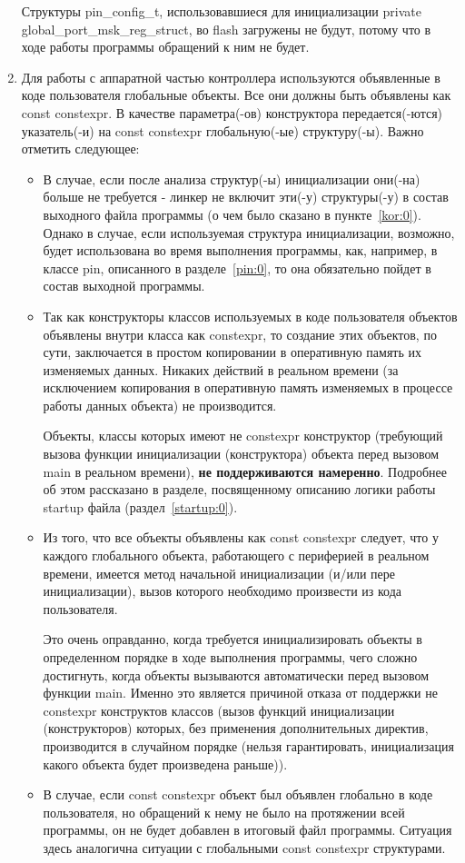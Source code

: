 \begin{enumerate}
	Структуры pin\_\-config\_\-t, использовавшиеся для инициализации private global\_\-port\_\-msk\_\-reg\_\-struct, во flash загружены не будут, потому что в ходе работы программы обращений к ним не будет.
	\label{kor:0}
	\item Для работы с аппаратной частью контроллера используются объявленные в коде пользователя глобальные объекты. Все они должны быть объявлены как const constexpr. В качестве параметра(-ов) конструктора передается(-ются) указатель(-и) на const constexpr глобальную(-ые) структуру(-ы). Важно отметить следующее:
	\begin{itemize}
		\item В случае, если после анализа структур(-ы) инициализации они(-на) больше не требуется - линкер не включит эти(-у) структуры(-у) в состав выходного файла программы (о чем было сказано в пункте~\ref{kor:0}). Однако в случае, если используемая структура инициализации, возможно, будет использована во время выполнения программы, как, например, в классе pin, описанного в разделе~\ref{pin:0}, то она обязательно пойдет в состав выходной программы.
		\item Так как конструкторы классов используемых в коде пользователя объектов объявлены внутри класса как constexpr, то создание этих объектов, по сути, заключается в простом копировании в оперативную память их изменяемых данных. Никаких действий в реальном времени (за исключением копирования в оперативную память изменяемых в процессе работы данных объекта) не производится.
		
		Объекты, классы которых имеют не constexpr конструктор (требующий вызова функции инициализации (конструктора) объекта перед вызовом main в реальном времени), \textbf{не поддерживаются намеренно}. Подробнее об этом рассказано в разделе, посвященному описанию логики работы startup файла (раздел~\ref{startup:0}).
		\item Из того, что все объекты объявлены как const constexpr следует, что у каждого глобального объекта, работающего с периферией в реальном времени, имеется метод начальной инициализации (и/или пере инициализации), вызов которого необходимо произвести из кода пользователя. 
		
		Это очень оправданно, когда требуется инициализировать объекты в определенном порядке в ходе выполнения программы, чего сложно достигнуть, когда объекты вызываются автоматически перед вызовом функции main. Именно это является причиной отказа от поддержки не constexpr конструктов классов (вызов функций инициализации (конструкторов) которых, без применения дополнительных директив, производится в случайном порядке (нельзя гарантировать, инициализация какого объекта будет произведена раньше)).
		
		\item В случае, если const constexpr объект был объявлен глобально в коде пользователя, но обращений к нему не было на протяжении всей программы, он не будет добавлен в итоговый файл программы. Ситуация здесь аналогична ситуации с глобальными const constexpr структурами.
	\end{itemize}
\end{enumerate}


\label{gp:0}				%
\label{pin:0}				%
\label{startup:0}			%